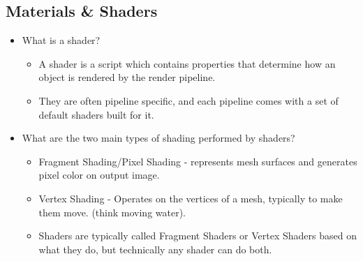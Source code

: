 \documentclass{article}
\begin{document}
\subsection{Materials \& Shaders}
\begin{itemize}
    
    
    \item What is a shader?
    \begin{itemize}
        \item A shader is a script which contains properties that determine how an object is rendered by the render pipeline.
        \item They are often pipeline specific, and each pipeline comes with a set of default shaders built for it.
    \end{itemize}
    \item What are the two main types of shading performed by shaders?
    \begin{itemize}
        \item Fragment Shading/Pixel Shading - represents mesh surfaces and generates pixel color on output image.
        \item Vertex Shading - Operates on the vertices of a mesh, typically to make them move. (think moving water).
        \item Shaders are typically called Fragment Shaders or Vertex Shaders based on what they do, but technically any shader can do both.
    \end{itemize}
    

\end{itemize}
\end{document}
